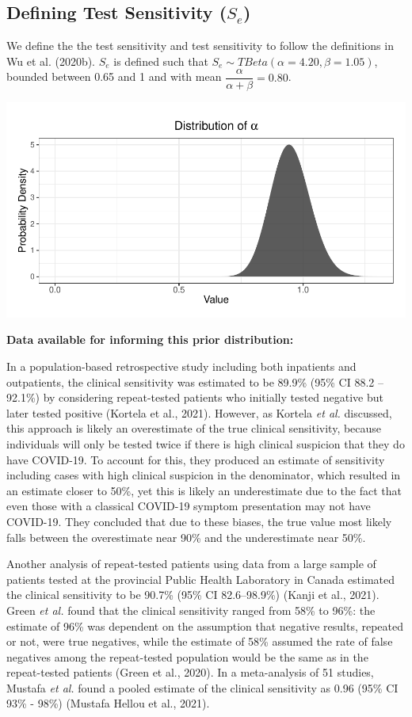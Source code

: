 \documentclass[12pt,twoside]{smiththesis}
\begin{document}
\hypertarget{defining-test-sensitivity-s_e}{%
\subsection{\texorpdfstring{Defining Test Sensitivity (\(S_e\))}{Defining Test Sensitivity (S\_e)}}\label{defining-test-sensitivity-s_e}}

We define the the test sensitivity and test sensitivity to follow the definitions in Wu et al. (2020b).
\(S_e\) is defined such that \(S_e \sim TBeta(\alpha = 4.20, \beta = 1.05)\), bounded between 0.65 and 1 and with mean \(\dfrac{\alpha}{\alpha + \beta} = 0.80\).
\begin{center}\includegraphics[width=0.8\linewidth]{thesis_files/figure-latex/unnamed-chunk-58-1} \end{center}

\textbf{Data available for informing this prior distribution:}

In a population-based retrospective study including both inpatients and outpatients, the clinical sensitivity was estimated to be 89.9\% (95\% CI 88.2 -- 92.1\%) by considering repeat-tested patients who initially tested negative but later tested positive (Kortela et al., 2021). However, as Kortela \emph{et al.} discussed, this approach is likely an overestimate of the true clinical sensitivity, because individuals will only be tested twice if there is high clinical suspicion that they do have COVID-19. To account for this, they produced an estimate of sensitivity including cases with high clinical suspicion in the denominator, which resulted in an estimate closer to 50\%, yet this is likely an underestimate due to the fact that even those with a classical COVID-19 symptom presentation may not have COVID-19. They concluded that due to these biases, the true value most likely falls between the overestimate near 90\% and the underestimate near 50\%.

Another analysis of repeat-tested patients using data from a large sample of patients tested at the provincial Public Health Laboratory in Canada estimated the clinical sensitivity to be 90.7\% (95\% CI 82.6--98.9\%) (Kanji et al., 2021). Green \emph{et al.} found that the clinical sensitivity ranged from 58\% to 96\%: the estimate of 96\% was dependent on the assumption that negative results, repeated or not, were true negatives, while the estimate of 58\% assumed the rate of false negatives among the repeat-tested population would be the same as in the repeat-tested patients (Green et al., 2020). In a meta-analysis of 51 studies, Mustafa \emph{et al.} found a pooled estimate of the clinical sensitivity as 0.96 (95\% CI 93\% - 98\%) (Mustafa Hellou et al., 2021).
\end{document}
